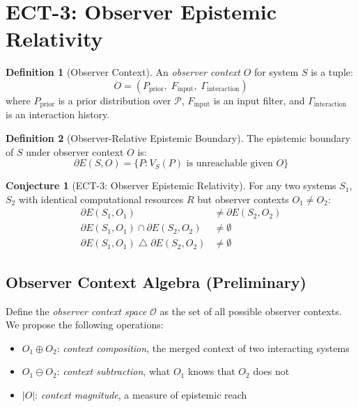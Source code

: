 \documentclass[12pt]{article}
\theoremstyle{definition}
\newtheorem{definition}{Definition}[section]
\newtheorem{conjecture}{Conjecture}[section]
\newcommand{\VS}{V_S}
\begin{document}
\section{ECT-3: Observer Epistemic Relativity}
\label{sec:ect3}

\begin{definition}[Observer Context]
An \emph{observer context} $O$ for system $S$ is a tuple:
\[
  O = (P_{\mathrm{prior}},\; F_{\mathrm{input}},\; \Gamma_{\mathrm{interaction}})
\]
where $P_{\mathrm{prior}}$ is a prior distribution over $\mathcal{P}$, $F_{\mathrm{input}}$ is an input filter, and $\Gamma_{\mathrm{interaction}}$ is an interaction history.
\end{definition}

\begin{definition}[Observer-Relative Epistemic Boundary]
The epistemic boundary of $S$ under observer context $O$ is:
\[
  \partial E(S, O) = \bigl\{ P : \VS(P) \text{ is unreachable given } O \bigr\}
\]
\end{definition}

\begin{conjecture}[ECT-3: Observer Epistemic Relativity]
\label{conj:ect3}
For any two systems $S_1$, $S_2$ with identical computational resources $R$ but observer contexts $O_1 \neq O_2$:
\begin{align}
  \partial E(S_1, O_1) &\neq \partial E(S_2, O_2) \tag{boundaries differ} \\
  \partial E(S_1, O_1) \cap \partial E(S_2, O_2) &\neq \emptyset \tag{shared unknowables exist} \\
  \partial E(S_1, O_1) \;\triangle\; \partial E(S_2, O_2) &\neq \emptyset \tag{asymmetric unknowables exist}
\end{align}
\end{conjecture}

\subsection{Observer Context Algebra (Preliminary)}

Define the \emph{observer context space} $\mathcal{O}$ as the set of all possible observer contexts. We propose the following operations:

\begin{itemize}[leftmargin=1.5em]
  \item $O_1 \oplus O_2$: \emph{context composition}, the merged context of two interacting systems
  \item $O_1 \ominus O_2$: \emph{context subtraction}, what $O_1$ knows that $O_2$ does not
  \item $|O|$: \emph{context magnitude}, a measure of epistemic reach
\end{itemize}
\end{document}
